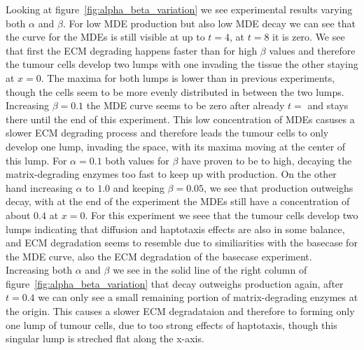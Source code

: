 Looking at figure~\ref{fig:alpha_beta_variation} we see experimental results varying both $\alpha$ and $\beta$. For low MDE production but also low MDE decay we can see that the curve for the MDEs is still visible at up to $t=4$, at $t=8$ it is zero. We see that first the ECM degrading happens faster than for high $\beta$ values and therefore the tumour cells develop two lumps with one invading the tissue the other staying at $x=0$. The maxima for both lumps is lower than in previous experiments, though the cells seem to be more evenly distributed in between the two lumps. Increasing $\beta=0.1$ the MDE curve seems to be zero after already $t=$ and stays there until the end of this experiment. This low concentration of MDEs casuses a slower ECM degrading process and therefore leads the tumour cells to only develop one lump, invading the space, with its maxima moving at the center of this lump. For $\alpha=0.1$ both values for $\beta$ have proven to be to high, decaying the matrix-degrading enzymes too fast to keep up with production.
On the other hand increasing $\alpha$ to $1.0$ and keeping $\beta=0.05$, we see that production outweighs decay, with at the end of the experiment the MDEs still have a concentration of about $0.4$ at $x=0$. For this experiment we seee that the tumour cells develop two lumps indicating that diffusion and haptotaxis effects are also in some balance, and ECM degradation seems to resemble due to similiarities with the basecase for the MDE curve, also the ECM degradation of the basecase experiment.
Increasing both $\alpha$ and $\beta$ we see in the solid line of the right column of figure~\ref{fig:alpha_beta_variation} that decay outweighs production again, after $t=0.4$ we can only see a small remaining portion of matrix-degrading enzymes at the origin. This causes a slower ECM degradataion and therefore to forming only one lump of tumour cells, due to too strong effects of haptotaxis, though this singular lump is streched flat along the x-axis.

